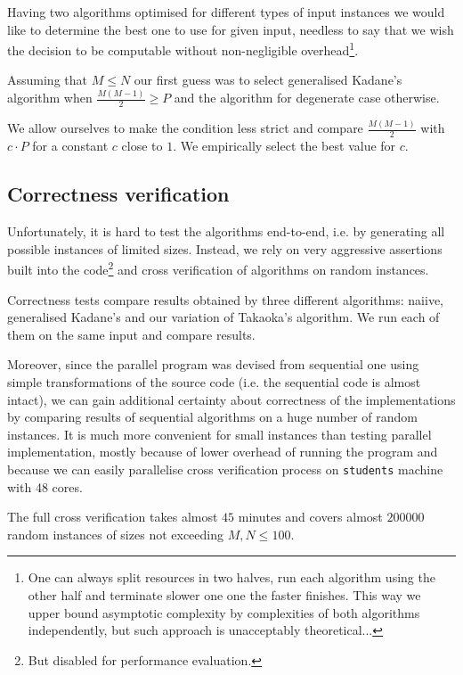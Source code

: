 Having two algorithms optimised for different types of input instances we would like to determine the best one to use for given input, needless to say that we wish the decision to be computable without non-negligible overhead\footnote{One can always split resources in two halves, run each algorithm using the other half and terminate slower one one the faster finishes. This way we upper bound asymptotic complexity by complexities of both algorithms independently, but such approach is unacceptably theoretical...}.

Assuming that $M \leq N$ our first guess was to select generalised Kadane's algorithm when $\frac{M (M - 1)}{2} \geq P$ and the algorithm for degenerate case otherwise.

We allow ourselves to make the condition less strict and compare $\frac{M (M - 1)}{2}$ with $c \cdot P$ for a constant $c$ close to $1$.
We empirically select the best value for $c$.

\subsection*{Correctness verification}

Unfortunately, it is hard to test the algorithms end-to-end, i.e. by generating all possible instances of limited sizes.
Instead, we rely on very aggressive assertions built into the code\footnote{But disabled for performance evaluation.} and cross verification of algorithms on random instances.

Correctness tests compare results obtained by three different algorithms: naiive, generalised Kadane's and our variation of Takaoka's algorithm.
We run each of them on the same input and compare results.

Moreover, since the parallel program was devised from sequential one using simple transformations of the source code (i.e. the sequential code is almost intact), we can gain additional certainty about correctness of the implementations by comparing results of sequential algorithms on a huge number of random instances.
It is much more convenient for small instances than testing parallel implementation, mostly because of lower overhead of running the program and because we can easily parallelise cross verification process on \verb+students+ machine with 48 cores.

The full cross verification takes almost $45$ minutes and covers almost $200000$ random instances of sizes not exceeding $M, N \leq 100$.

